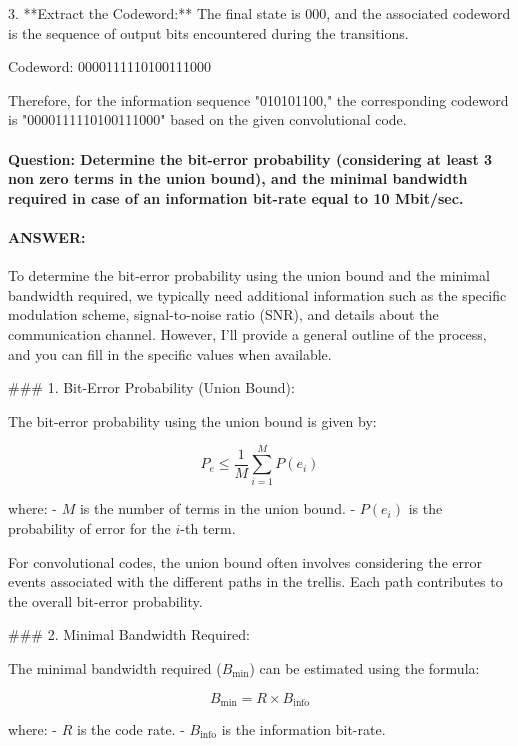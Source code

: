 \documentclass[colorlinks,11pt,a4paper,normalphoto,withhyper,ragged2e]{altareport}
\begin{document}
				3. **Extract the Codeword:**
				The final state is 000, and the associated codeword is the sequence of output bits encountered during the transitions.
				
				Codeword: 0000111110100111000
				
				Therefore, for the information sequence "010101100," the corresponding codeword is "0000111110100111000" based on the given convolutional code.
				
				
				
				
				\paragraph{Question: Determine the bit-error probability (considering at least 3 non zero terms in the union bound), and the minimal bandwidth required in case of an information bit-rate equal to 10 Mbit/sec.}
				\paragraph{ANSWER:}
				
				To determine the bit-error probability using the union bound and the minimal bandwidth required, we typically need additional information such as the specific modulation scheme, signal-to-noise ratio (SNR), and details about the communication channel. However, I'll provide a general outline of the process, and you can fill in the specific values when available.
				
				### 1. Bit-Error Probability (Union Bound):
				
				The bit-error probability using the union bound is given by:
				
				\[ P_e \leq \frac{1}{M} \sum_{i=1}^{M} P(e_i) \]
				
				where:
				- \( M \) is the number of terms in the union bound.
				- \( P(e_i) \) is the probability of error for the \( i \)-th term.
				
				For convolutional codes, the union bound often involves considering the error events associated with the different paths in the trellis. Each path contributes to the overall bit-error probability.
				
				### 2. Minimal Bandwidth Required:
				
				The minimal bandwidth required (\( B_{\text{min}} \)) can be estimated using the formula:
				
				\[ B_{\text{min}} = R \times B_{\text{info}} \]
				
				where:
				- \( R \) is the code rate.
				- \( B_{\text{info}} \) is the information bit-rate.
				
\end{document}
